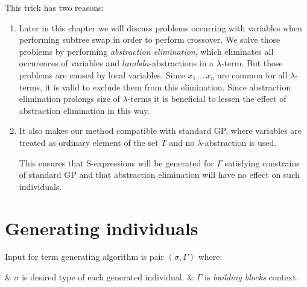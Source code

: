 \documentclass[12pt,a4paper]{report}
\makeatletter
\newcommand{\lterm}{$\lambda$-term\xspace}
\newcommand{\lterms}{$\lambda$-terms\xspace}
\newcommand{\atTree}{@-tree\xspace}
\newenvironment{enum}
{\begin{easylist}[itemize]}
{\end{easylist}}
\newenvironment{todo}
{ ~\\[0.5em]
  {\color{red}\textbf{TODO}}
  \begin{easylist}[itemize]}
{ \end{easylist}
  ~}
\makeatother
\begin{document}
This trick has two reasons:
\begin{enumerate}
 \item Later in this chapter we will discuss problems occurring with variables
       when performing subtree swap in order to perform crossover.
       We solve those problems by performing \textit{abstraction elimination},
       which eliminates all occurences of variables and $lambda$-abstractions
       in a \lterm. But those problems are caused by local variables. 
       Since $x_1\,\dots\,x_n$ are common for all \lterms, it is valid
       to exclude them from this elimination. Since abstraction elimination
       prolongs size of \lterms it is beneficial to lessen 
       the effect of abstraction elimination in this way. 
        
 \item It also makes our method compatible with standard GP, where
       variables are treated as ordinary element of the set $T$
       and no $\lambda$-abstraction is used.
       
       This ensures that S-expressions will be generated for
       $\Gamma$ satisfying constrains of standard GP and that
       abstraction elimination will have no effect on such individuals.
\end{enumerate}





\section{Generating individuals}



Input for term generating algorithm is pair $(\sigma,\Gamma)$ where:\\

\begin{enum}
 & $\sigma$ is desired type of each generated individual.
 & $\Gamma$ is \textit{building blocks} context. 
\end{enum}~
 
\end{document}
